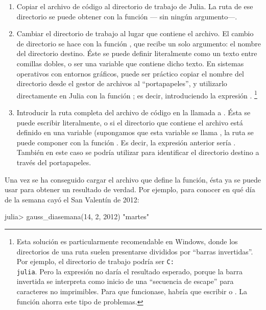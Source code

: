 ﻿\documentclass[spanish]{article}
\begin{document}
\begin{enumerate}
  \item Copiar el archivo de código  al directorio de trabajo de Julia. La ruta de ese directorio se puede obtener con la función  --- sin ningún argumento---.
  \item Cambiar el directorio de trabajo al lugar que contiene el archivo. El cambio de directorio se hace con la función , que recibe un solo argumento: el nombre del directorio destino. Éste se puede definir literalmente como un texto entre comillas dobles, o ser una variable que contiene dicho texto. En sistemas operativos con entornos gráficos, puede ser práctico copiar el nombre del directorio desde el gestor de archivos al ``portapapeles'', y utilizarlo directamente en Julia con la función ; es decir, introduciendo la expresión .%
  \footnote{%
  Esta solución es particularmente recomendable en Windows, donde los directorios de una ruta suelen presentarse divididos por ``barras invertidas''. Por ejemplo, el directorio de trabajo podría ser \texttt{C:\\julia}. Pero la expresión  no daría el resultado esperado, porque la barra invertida se interpreta como inicio de una ``secuencia de escape'' para caracteres no imprimibles. Para que funcionase, habría que escribir  o . La función  ahorra este tipo de problemas.%
  }
  \item Introducir la ruta completa del archivo de código en la llamada a . Ésta se puede escribir literalmente, o si el directorio que contiene el archivo está definido en una variable (supongamos que esta variable se llama , la ruta se puede componer con la función . Es decir, la expresión anterior sería . También en este caso se podría utilizar  para identificar el directorio destino a través del portapapeles.
\end{enumerate}

Una vez se ha conseguido cargar el archivo que define la función, ésta ya se puede usar para obtener un resultado de verdad. Por ejemplo, para conocer en qué día de la semana cayó el San Valentín de 2012:

julia> gauss_diasemana(14, 2, 2012)
"martes"
\end{document}
